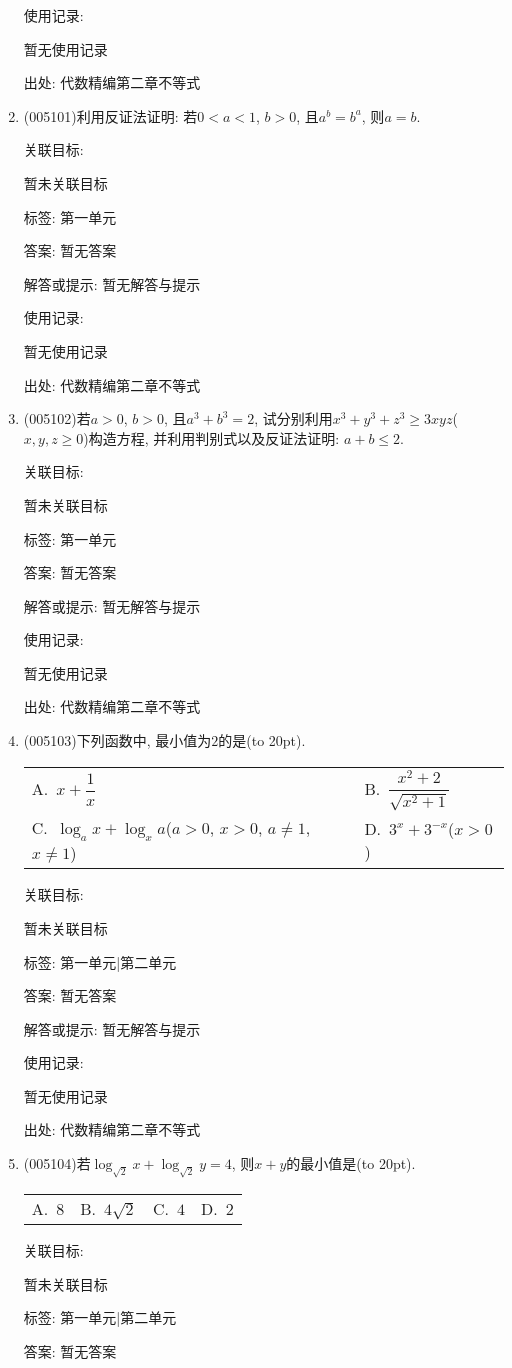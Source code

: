 \documentclass[10pt,a4paper]{article}
\newcommand{\bracket}[1]{(\hbox to #1pt{})}
\newcommand{\twoch}[4]{\par\begin{tabular}{p{.46\textwidth}p{.46\textwidth}}
A.~#1& B.~#2\\
C.~#3& D.~#4
\end{tabular}}
\newcommand{\fourch}[4]{\par\begin{tabular}{p{.23\textwidth}p{.23\textwidth}p{.23\textwidth}p{.23\textwidth}}
A.~#1 &B.~#2& C.~#3& D.~#4
\end{tabular}}
\begin{document}
\begin{enumerate}[1.]
使用记录:

暂无使用记录


出处: 代数精编第二章不等式
\item { (005101)}利用反证法证明: 若$0<a<1$, $b>0$, 且$a^b=b^a$, 则$a=b$.


关联目标:

暂未关联目标



标签: 第一单元

答案: 暂无答案

解答或提示: 暂无解答与提示

使用记录:

暂无使用记录


出处: 代数精编第二章不等式
\item { (005102)}若$a>0$, $b>0$, 且$a^3+b^3=2$, 试分别利用$x^3+y^3+z^3\ge 3xyz$($x,y,z\ge 0$)构造方程, 并利用判别式以及反证法证明: $a+b\le 2$.


关联目标:

暂未关联目标



标签: 第一单元

答案: 暂无答案

解答或提示: 暂无解答与提示

使用记录:

暂无使用记录


出处: 代数精编第二章不等式
\item { (005103)}下列函数中, 最小值为$2$的是\bracket{20}.
\twoch{$x+\dfrac 1x$}{$\dfrac{x^2+2}{\sqrt{x^2+1}}$}{$\log_ax+\log_xa$($a>0$, $x>0$, $a\ne 1$, $x\ne 1$)}{$3^x+3^{-x}$($x>0$)}


关联目标:

暂未关联目标



标签: 第一单元|第二单元

答案: 暂无答案

解答或提示: 暂无解答与提示

使用记录:

暂无使用记录


出处: 代数精编第二章不等式
\item { (005104)}若$\log_{\sqrt 2}x+\log_{\sqrt 2}y=4$, 则$x+y$的最小值是\bracket{20}.
\fourch{$8$}{$4\sqrt 2$}{$4$}{$2$}


关联目标:

暂未关联目标



标签: 第一单元|第二单元

答案: 暂无答案


\end{enumerate}
\end{document}
